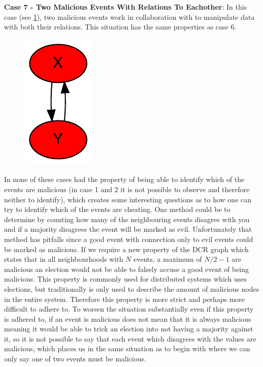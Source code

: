 	\newpar \textbf{Case 7 - Two Malicious Events With Relations To Eachother}: In this case (see \ref{fig:consensus:two-malicious-with-twoway-malicious-relation}), two malicious events work in collaboration with to manipulate data with both their relations. This situation has the same properties as case 6.
	
	\begin{figure}[H]
		\centering
		\includegraphics[]{5validation/images/7.pdf}
		\caption{}
		\label{fig:consensus:two-malicious-with-twoway-malicious-relation}
	\end{figure}
	

\newpar In none of these cases had the property of being able to identify which of the events are malicious (in case 1 and 2 it is not possible to observe and therefore neither to identify), which creates some interesting questions as to how one can try to identify which of the events are cheating. One method could be to determine by counting how many of the neighbouring events disagree with you and if a majority disagrees the event will be marked as evil. Unfortunately that method has pitfalls since a good event with connection only to evil events could be marked as malicious. If we require a new property of the DCR graph which states that in all neighbourhoods with $N$ events, a maximum of $N/2-1$ are malicious an election would not be able to falsely accuse a good event of being malicious. This property is commonly used for distributed systems which uses elections, but traditionally is only used to describe the amount of malicious nodes in the entire system. Therefore this property is more strict and perhaps more difficult to adhere to. To worsen the situation substantially even if this property is adhered to, if an event is malicious does not mean that it is always malicious meaning it would be able to trick an election into not having a majority against it, so it is not possible to say that each event which disagrees with the values are malicious, which places us in the same situation as to begin with where we can only say one of two events must be malicious.

